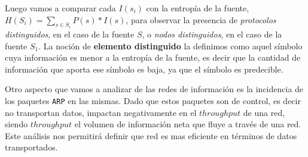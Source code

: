 Luego vamos a comparar cada $I(s_{i})$ con la entropía de la fuente, $H(S_{i}) = \sum\limits_{s \in S_{i}} P(s) * I(s)$, para observar la presencia de \emph{protocolos distinguidos}, en el caso de la fuente $S$, o \emph{nodos distinguidos}, en el caso de la fuente $S_{1}$. La noción de \textbf{elemento distinguido} la definimos como aquel símbolo cuya información es menor a la entropía de la fuente, es decir que la cantidad de información que aporta ese símbolo es baja, ya que el símbolo es predecible.

Otro aspecto que vamos a analizar de las redes de información es la incidencia de los paquetes \texttt{ARP} en las mismas. Dado que estos paquetes son de control, es decir no transportan datos, impactan negativamente en el $throughput$ de una red, siendo $throughput$ el volumen de información neta que fluye a través de una red. Este análisis nos permitirá definir que red es mas eficiente en términos de datos transportados.
